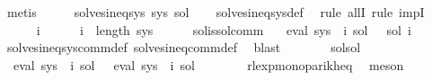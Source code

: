 \begin{isabellebody}
\ metis\isanewline
\ \ \isamarkupfalse%
\ \isamarkupfalse%
\ {\isachardoublequoteopen}solves{\isacharunderscore}{\kern0pt}ineq{\isacharunderscore}{\kern0pt}sys\ sys\ {\isacharquery}{\kern0pt}sol{\isacharprime}{\kern0pt}{\isachardoublequoteclose}\isanewline
\ \ \isamarkupfalse%
\ solves{\isacharunderscore}{\kern0pt}ineq{\isacharunderscore}{\kern0pt}sys{\isacharunderscore}{\kern0pt}def\ \isamarkupfalse%
\ {\isacharparenleft}{\kern0pt}rule\ allI{\isacharcomma}{\kern0pt}\ rule\ impI{\isacharparenright}{\kern0pt}\isanewline
\ \ \ \ \isamarkupfalse%
\ i\isanewline
\ \ \ \ \isamarkupfalse%
\ {\isachardoublequoteopen}i\ {\isacharless}{\kern0pt}\ length\ sys{\isachardoublequoteclose}\isanewline
\ \ \ \ \isamarkupfalse%
\ sol{\isacharunderscore}{\kern0pt}is{\isacharunderscore}{\kern0pt}sol{\isacharunderscore}{\kern0pt}comm\ \isamarkupfalse%
\ {\isachardoublequoteopen}{\isasymPsi}\ {\isacharparenleft}{\kern0pt}eval\ {\isacharparenleft}{\kern0pt}sys\ {\isacharbang}{\kern0pt}\ i{\isacharparenright}{\kern0pt}\ sol{\isacharparenright}{\kern0pt}\ {\isasymsubseteq}\ {\isasymPsi}\ {\isacharparenleft}{\kern0pt}sol\ i{\isacharparenright}{\kern0pt}{\isachardoublequoteclose}\isanewline
\ \ \ \ \ \ \isamarkupfalse%
\ solves{\isacharunderscore}{\kern0pt}ineq{\isacharunderscore}{\kern0pt}sys{\isacharunderscore}{\kern0pt}comm{\isacharunderscore}{\kern0pt}def\ solves{\isacharunderscore}{\kern0pt}ineq{\isacharunderscore}{\kern0pt}comm{\isacharunderscore}{\kern0pt}def\ \isamarkupfalse%
\ blast\isanewline
\ \ \ \ \isamarkupfalse%
\ \isamarkupfalse%
\ sol{\isacharprime}{\kern0pt}{\isacharunderscore}{\kern0pt}sol\ \isamarkupfalse%
\ {\isachardoublequoteopen}{\isasymPsi}\ {\isacharparenleft}{\kern0pt}eval\ {\isacharparenleft}{\kern0pt}sys\ {\isacharbang}{\kern0pt}\ i{\isacharparenright}{\kern0pt}\ {\isacharquery}{\kern0pt}sol{\isacharprime}{\kern0pt}{\isacharparenright}{\kern0pt}\ {\isacharequal}{\kern0pt}\ {\isasymPsi}\ {\isacharparenleft}{\kern0pt}eval\ {\isacharparenleft}{\kern0pt}sys\ {\isacharbang}{\kern0pt}\ i{\isacharparenright}{\kern0pt}\ sol{\isacharparenright}{\kern0pt}{\isachardoublequoteclose}\isanewline
\ \ \ \ \ \ \isamarkupfalse%
\ rlexp{\isacharunderscore}{\kern0pt}mono{\isacharunderscore}{\kern0pt}parikh{\isacharunderscore}{\kern0pt}eq\ \isamarkupfalse%
\ meson\isanewline

\end{isabellebody}
